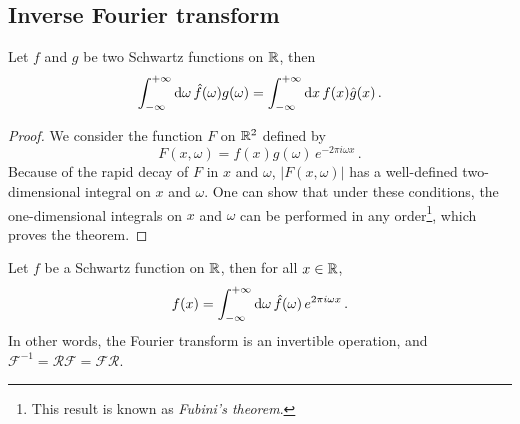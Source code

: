 \subsection{Inverse Fourier transform}
\begin{theorem}
  \label{thm:fourier-adj}
  Let $f$ and $g$ be two Schwartz functions on $\mathbb{R}$, then
  \begin{equation}
    \int_{-\infty}^{+\infty}\mathrm{d}{\omega}\,\hat{f}(\omega)g(\omega)=\int_{-\infty}^{+\infty}\mathrm{d}{x}\,f(x)\hat{g}(x)\,.
  \end{equation}
\end{theorem}
\begin{proof}
  We consider the function $F$ on $\mathbb{R}^2$ defined by
  \begin{equation}
    F(x,\omega)=f(x)g(\omega)\,e^{-2\pi i\omega x}\,.
  \end{equation}
  Because of the rapid decay of $F$ in $x$ and $\omega$, $|F(x,\omega)|$ has a
  well-defined two-dimensional integral on $x$ and $\omega$. One can show that under these
  conditions, the one-dimensional integrals on $x$ and $\omega$ can be performed in any
  order\footnote{This result is known as \emph{Fubini's theorem}.}, which proves the
  theorem.
\end{proof}
\begin{theorem}
  \label{thm:fourier-inv}
  Let $f$ be a Schwartz function on $\mathbb{R}$, then for all $x\in\mathbb{R}$,
  \begin{equation}
    f(x)=\int_{-\infty}^{+\infty}\mathrm{d}{\omega}\,\hat{f}(\omega)\,e^{2\pi i\omega x}\,.
  \end{equation}
  In other words, the Fourier transform is an invertible operation, and
  $\mathcal{F}^{-1}=\mathcal{R}\mathcal{F}=\mathcal{F}\mathcal{R}$.
\end{theorem}
